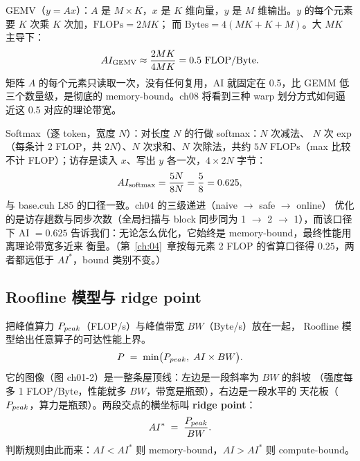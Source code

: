 GEMV（$y = Ax$）：$A$ 是 $M{\times}K$，$x$ 是 $K$ 维向量，$y$ 是
$M$ 维输出。$y$ 的每个元素要 $K$ 次乘 $K$ 次加，$\mathrm{FLOPs} = 2MK$；
而 $\mathrm{Bytes} = 4(MK + K + M)$。大 $MK$ 主导下：
\begin{equation}
  AI\sb{\mathrm{GEMV}} \approx \frac{2MK}{4MK} = 0.5 \ \mathrm{FLOP/Byte}.
\end{equation}
矩阵 $A$ 的每个元素只读取一次，没有任何复用，AI 就固定在 0.5，比 GEMM 低
三个数量级，是彻底的 memory-bound。ch08 将看到三种 warp 划分方式如何逼近这
0.5 对应的理论带宽。

Softmax（逐 token，宽度 $N$）：对长度 $N$ 的行做 softmax：$N$ 次减法、
$N$ 次 exp（每条计 2 FLOP，共 $2N$）、$N$ 次求和、$N$ 次除法，共约 $5N$
FLOPs（max 比较不计 FLOP）；访存是读入 $x$、写出 $y$ 各一次，$4 \times 2N$ 字节：
\begin{equation}
  AI\sb{\mathrm{softmax}} = \frac{5N}{8N} = \frac{5}{8} = 0.625,
\end{equation}
与 base.cuh L85 的口径一致。ch04 的三级递进（naive $\to$ safe $\to$ online）
优化的是访存趟数与同步次数（全局扫描与 block 同步同为 1 $\to$ 2 $\to$ 1），而该口径下
AI $=0.625$ 告诉我们：无论怎么优化，它始终是 memory-bound，最终性能用离理论带宽多近来
衡量。（第~\ref{ch:04}~章按每元素 2 FLOP 的省算口径得 $0.25$，两者都远低于
$AI^*$，bound 类别不变。）

\subsection{Roofline 模型与 ridge point}

把峰值算力 $P\sb{peak}$（FLOP/s）与峰值带宽 $BW$（Byte/s）放在一起，
Roofline 模型给出任意算子的可达性能上界。
\begin{equation}
  P \;=\; \min\bigl(P\sb{peak},\; AI \times BW\bigr).
  \label{eq:ch01-roofline}
\end{equation}
它的图像（图 ch01-2）是一整条屋顶线：左边是一段斜率为 $BW$ 的斜坡
（强度每多 1 FLOP/Byte，性能就多 $BW$，带宽是瓶颈），右边是一段水平的
天花板（$P\sb{peak}$，算力是瓶颈）。两段交点的横坐标叫
\textbf{ridge point}：
\begin{equation}
  AI^{*} \;=\; \frac{P\sb{peak}}{BW}.
  \label{eq:ch01-ridge}
\end{equation}
判断规则由此而来：$AI < AI^{*}$ 则 memory-bound，$AI > AI^{*}$ 则
compute-bound。

